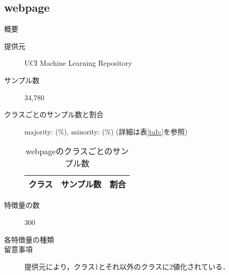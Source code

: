 \subsection{webpage}
\begin{description}
    \item[概要] \cite{webpage}
    \item[提供元] UCI Machine Learning Repository
    \item[サンプル数] 34,780
    \item[クラスごとのサンプル数と割合] majority:  (\%), minority:  (\%) (詳細は表\ref{tab:}を参照)

        \begin{table}
            \centering
            \caption{webpageのクラスごとのサンプル数}
            \label{tab:webpage}
            \begin{tabular}{lrc} \hline
                \multicolumn{1}{c}{クラス}&
                \multicolumn{1}{c}{サンプル数}&
                \multicolumn{1}{c}{割合}\\
                \hline
                \hline

                \hline
            \end{tabular}
        \end{table}

    \item[特徴量の数] 300
    \item[各特徴量の種類] \mbox{}
        
    \item[留意事項] 提供元により，クラス1とそれ以外のクラスに2値化されている．
\end{description}


